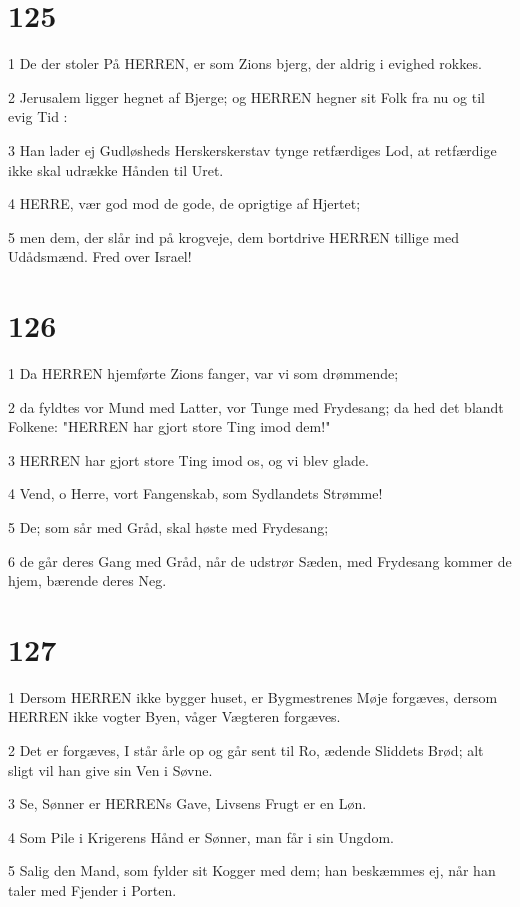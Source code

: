 \chapter{125}

\par 1 De der stoler På HERREN, er som Zions bjerg, der aldrig i evighed rokkes.
\par 2 Jerusalem ligger hegnet af Bjerge; og HERREN hegner sit Folk fra nu og til evig Tid :
\par 3 Han lader ej Gudløsheds Herskerskerstav tynge retfærdiges Lod, at retfærdige ikke skal udrække Hånden til Uret.
\par 4 HERRE, vær god mod de gode, de oprigtige af Hjertet;
\par 5 men dem, der slår ind på krogveje, dem bortdrive HERREN tillige med Udådsmænd. Fred over Israel!

\chapter{126}

\par 1 Da HERREN hjemførte Zions fanger, var vi som drømmende;
\par 2 da fyldtes vor Mund med Latter, vor Tunge med Frydesang; da hed det blandt Folkene: "HERREN har gjort store Ting imod dem!"
\par 3 HERREN har gjort store Ting imod os, og vi blev glade.
\par 4 Vend, o Herre, vort Fangenskab, som Sydlandets Strømme!
\par 5 De; som sår med Gråd, skal høste med Frydesang;
\par 6 de går deres Gang med Gråd, når de udstrør Sæden, med Frydesang kommer de hjem, bærende deres Neg.

\chapter{127}

\par 1 Dersom HERREN ikke bygger huset, er Bygmestrenes Møje forgæves, dersom HERREN ikke vogter Byen, våger Vægteren forgæves.
\par 2 Det er forgæves, I står årle op og går sent til Ro, ædende Sliddets Brød; alt sligt vil han give sin Ven i Søvne.
\par 3 Se, Sønner er HERRENs Gave, Livsens Frugt er en Løn.
\par 4 Som Pile i Krigerens Hånd er Sønner, man får i sin Ungdom.
\par 5 Salig den Mand, som fylder sit Kogger med dem; han beskæmmes ej, når han taler med Fjender i Porten.

